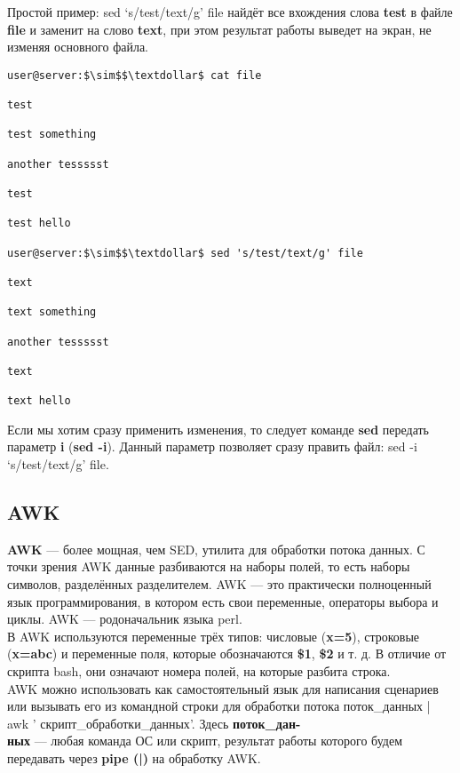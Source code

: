 \documentclass[14pt, a4paper]{article}
\begin{document}
Простой пример: \colorbox{backcolour}{sed ‘s/test/text/g’ file} найдёт все вхождения слова \textbf{test} в файле \textbf{file} и
заменит на слово \textbf{text}, при этом результат работы выведет на экран, не изменяя основного файла.

\vspace{0.3cm}

\begin{lstlisting}
user@server:$\sim$$\textdollar$ cat file

test

test something

another tessssst

test

test hello

user@server:$\sim$$\textdollar$ sed 's/test/text/g' file

text

text something

another tessssst

text

text hello

\end{lstlisting}
\vspace{0.2cm}

Если мы хотим сразу применить изменения, то следует команде \textbf{sed} передать параметр \textbf{i} (\textbf{sed -i}).
Данный параметр позволяет сразу править файл: \colorbox{backcolour}{sed -i ‘s/test/text/g’ file}.

\subsection*{AWK} 

\textbf{AWK} — более мощная, чем SED, утилита для обработки потока данных. С точки зрения AWK данные
разбиваются на наборы полей, то есть наборы символов, разделённых разделителем. AWK — это
практически полноценный язык программирования, в котором есть свои переменные, операторы
выбора и циклы. AWK — родоначальник языка perl.\\

В AWK используются переменные трёх типов: числовые (\textbf{x=5}), строковые (\textbf{x=abc}) и переменные поля,
которые обозначаются \textbf{\$1}, \textbf{\$2} и т. д. В отличие от скрипта bash, они означают номера полей, на
которые разбита строка.\\

AWK можно использовать как самостоятельный язык для написания сценариев или вызывать его из
командной строки для обработки потока 
\colorbox{backcolour}{поток\_данных | awk '{ скрипт\_обработки\_данных}'}. Здесь \textbf{поток\_дан-} \\
\textbf{ных} — любая команда ОС или скрипт, результат работы которого будем передавать через \textbf{pipe (|)} на обработку AWK.\\
\end{document}
